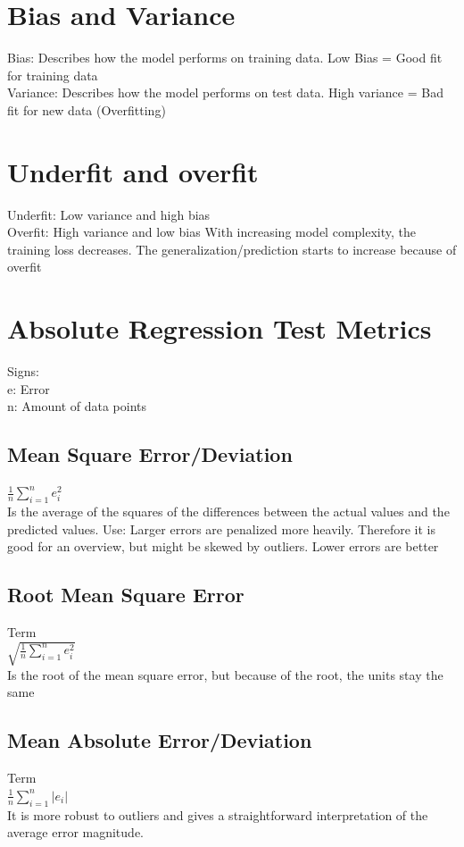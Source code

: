 \documentclass{article}
\begin{document}
\section{Bias and Variance}
Bias: Describes how the model performs on training data. Low Bias = Good fit for training data\\
Variance: Describes how the model performs on test data. High variance = Bad fit for new data (Overfitting) \\

\section{Underfit and overfit}
Underfit: Low variance and high bias \\
Overfit: High variance and low bias
With increasing model complexity, the training loss decreases. The generalization/prediction starts to increase because of overfit
\section{Absolute Regression Test Metrics}
Signs: \\
e: Error \\
n: Amount of data points\\

\subsection{Mean Square Error/Deviation}
$\frac{1}{n} \sum_{i = 1}^{n} e_i^2 $ \\
Is the average of the squares of the differences between the actual values and the predicted values.
Use: Larger errors are penalized more heavily. Therefore it is good for an overview, but might be skewed by outliers. Lower errors are better
\subsection{Root Mean Square Error}
Term\\
$ \sqrt{\frac{1}{n} \sum_{i = 1}^{n} e_i^2 }$  \\
Is the root of the mean square error, but because of the root, the units stay the same
\subsection{Mean Absolute Error/Deviation}
Term\\
$ \frac{1}{n} \sum_{i = 1}^{n} | e_i\vert$ \\
It is more robust to outliers and gives a straightforward interpretation of the average error magnitude.
\end{document}
